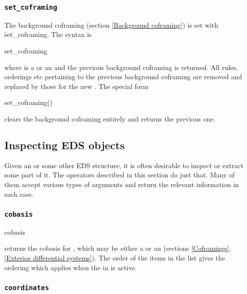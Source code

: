 \subsubsection{\tt set\_coframing}
\label{set_coframing}

The background coframing (section \ref{Background coframing}) is set with
\f{set\_coframing}. The syntax is
\begin{edssyntax}
   set\_coframing 
\end{edssyntax}
where  is a  or an  and the previous
background coframing is returned. All rules, orderings etc pertaining to the
previous background coframing are removed and replaced by those for the new
. The special form
\begin{edssyntax}
   set\_coframing()
\end{edssyntax}
clears the background coframing entirely and returns the previous one.



\subsection{Inspecting EDS objects}
\label{Inspecting EDS objects}

Given an  or some other EDS structure, it is often desirable to
inspect or extract some part of it. The operators described in this section
do just that. Many of them accept various types of arguments and return the
relevant information in each case.

\subsubsection{\tt cobasis}
\label{cobasis}

\begin{edssyntax}
	cobasis 
\end{edssyntax}
returns the cobasis for , which may be either a 
or an  (sections \ref{Coframings}, \ref{Exterior differential
systems}). The order of the items in the list gives the 
ordering which applies when the  in  is active.

\subsubsection{\tt coordinates}
\label{coordinates}


